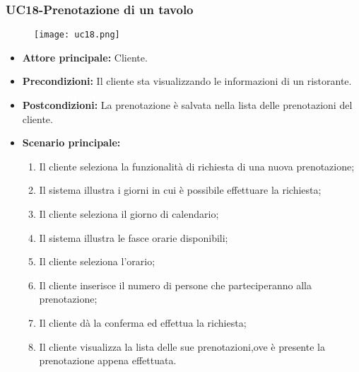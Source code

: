 \subsubsection{UC18-Prenotazione di un tavolo}
\begin{figure}[h] \texttt{[image: uc18.png]} \end{figure}
\begin{itemize}
    \item \textbf{Attore principale: }Cliente.
    \item \textbf{Precondizioni: }Il cliente sta visualizzando le informazioni di un ristorante.
    \item \textbf{Postcondizioni: }La prenotazione è salvata nella lista delle prenotazioni del cliente.
    \item \textbf{Scenario principale:}
        \begin{enumerate}
            \item Il cliente seleziona la funzionalità di richiesta di una nuova prenotazione;
            \item Il sistema illustra i giorni in cui è possibile effettuare la richiesta;
            \item Il cliente seleziona il giorno di calendario;
            \item Il sistema illustra le fasce orarie disponibili;
            \item Il cliente seleziona l'orario;
            \item Il cliente inserisce il numero di persone che parteciperanno alla prenotazione;
            \item Il cliente dà la conferma ed effettua la richiesta;
            \item Il cliente visualizza la lista delle sue prenotazioni,ove è presente la prenotazione appena
            effettuata.
        \end{enumerate}
\end{itemize}

\pagebreak
